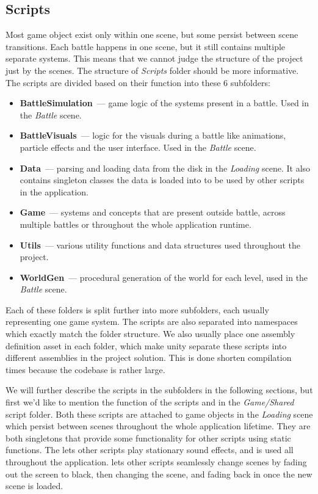 \subsection{Scripts}

Most game object exist only within one scene, but some persist between scene transitions.
Each battle happens in one scene, but it still contains multiple separate systems.
This means that we cannot judge the structure of the project just by the scenes.
The structure of \emph{Scripts} folder should be more informative.
The scripts are divided based on their function into these 6 subfolders:
\begin{itemize}
    \item \textbf{BattleSimulation}~--- game logic of the systems present in a battle. Used in the \emph{Battle} scene.
    \item \textbf{BattleVisuals}~--- logic for the visuals during a battle like animations, particle effects and the user interface. Used in the \emph{Battle} scene.
    \item \textbf{Data}~--- parsing and loading data from the disk in the \emph{Loading} scene. It also contains singleton classes the data is loaded into to be used by other scripts in the application.
    \item \textbf{Game}~--- systems and concepts that are present outside battle, across multiple battles or throughout the whole application runtime.
    \item \textbf{Utils}~--- various utility functions and data structures used throughout the project.
    \item \textbf{WorldGen}~--- procedural generation of the world for each level, used in the \emph{Battle} scene.
\end{itemize}

Each of these folders is split further into more subfolders, each usually representing one game system.
The scripts are also separated into namespaces which exactly match the folder structure.
We also usually place one assembly definition asset in each folder, which make unity separate these scripts into different assemblies in the project solution.
This is done shorten compilation times because the codebase is rather large.

We will further describe the scripts in the subfolders in the following sections, but first we'd like to mention the function of the scripts  and  in the \emph{Game/Shared} script folder.
Both these scripts are attached to game objects in the \emph{Loading} scene which persist between scenes throughout the whole application lifetime.
They are both singletons that provide some functionality for other scripts using static functions.
The  lets other scripts play stationary sound effects, and is used all throughout the application.
 lets other scripts seamlessly change scenes by fading out the screen to black, then changing the scene, and fading back in once the new scene is loaded.

